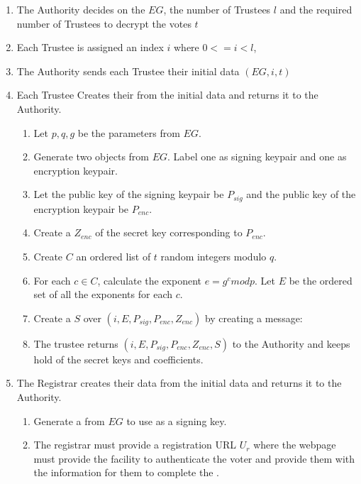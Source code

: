 \begin{enumerate}
    \item The Authority decides on the  $EG$, the number of Trustees $l$ and the required number of Trustees to decrypt the votes $t$
    \item Each Trustee is assigned an index $i$ where $0 <= i < l$,
    \item The Authority sends each Trustee their initial data $(EG, i, t)$
    \item Each Trustee Creates their  from the initial data and returns it to the Authority.
          \begin{enumerate}
              \item Let $p,q,g$ be the parameters from $EG$.
              \item Generate two  objects from $EG$. Label one as signing keypair and one as encryption keypair.
              \item Let the public key of the signing keypair be $P_{sig}$ and the public key of the encryption keypair be $P_{enc}$.
              \item Create a  $Z_{enc}$ of the secret key corresponding to $P_{enc}$.
              \item Create $C$ an ordered list of $t$ random integers modulo $q$.
              \item For each $c \in C$, calculate the exponent $e = g^c mod p$. Let $E$ be the ordered set of all the exponents for each $c$.
              \item Create a  $S$ over $(i, E, P_{sig}, P_{enc}, Z_{enc})$ by creating a message: 
              \item The trustee returns $(i, E, P_{sig}, P_{enc}, Z_{enc}, S)$ to the Authority and keeps hold of the secret keys and coefficients.
          \end{enumerate}
    \item The Registrar creates their  data from the initial data and returns it to the Authority.
          \begin{enumerate}
              \item Generate a  from $EG$ to use as a signing key.
              \item The registrar must provide a registration URL $U_r$ where the webpage must provide the facility to authenticate the voter and provide them with the information for them to complete the .

\end{enumerate}
\end{enumerate}
